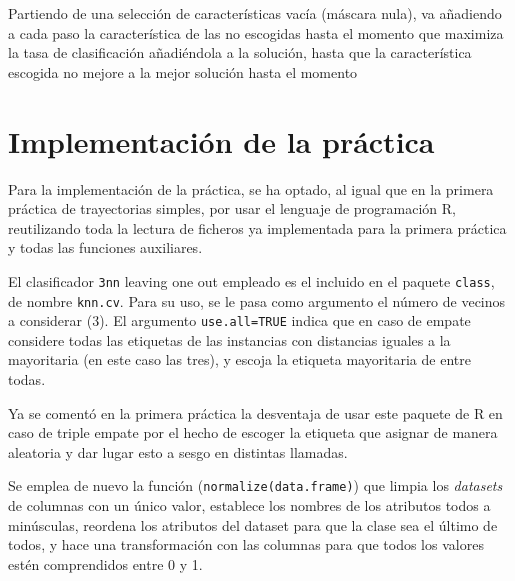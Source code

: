 \documentclass[a4paper,11pt]{article}
\begin{document}
Partiendo de una selección de características vacía (máscara nula), va añadiendo a cada paso la característica
de las no escogidas hasta el momento que maximiza la tasa de clasificación añadiéndola a la solución, hasta
que la característica escogida no mejore a la mejor solución hasta el momento

\section{Implementación de la práctica}
Para la implementación de la práctica, se ha optado, al igual que en la primera práctica de trayectorias simples,
por usar el lenguaje de programación R, reutilizando toda la lectura de ficheros ya implementada para la primera práctica
y todas las funciones auxiliares.

El clasificador \texttt{3nn} leaving one out empleado es el incluido en el paquete \texttt{class}, de nombre
\texttt{knn.cv}. Para su uso, se le pasa como argumento el número de vecinos a considerar (3). El argumento 
\texttt{use.all=TRUE} indica que en caso de empate considere todas las etiquetas de las instancias con distancias 
iguales a la mayoritaria (en este caso las tres), y escoja la etiqueta mayoritaria de entre todas. 

Ya se comentó en la primera práctica la desventaja de usar este paquete de R en caso de triple empate por el hecho de
escoger la etiqueta que asignar de manera aleatoria y dar lugar esto a sesgo en distintas llamadas.

Se emplea de nuevo la función (\texttt{normalize(data.frame)}) que limpia los \textit{datasets} de columnas con
un único valor, establece los nombres de los atributos todos a minúsculas, reordena los atributos del dataset para que
la clase sea el último de todos, y hace una transformación con las columnas para que todos los valores estén comprendidos
entre 0 y 1.
\end{document}
